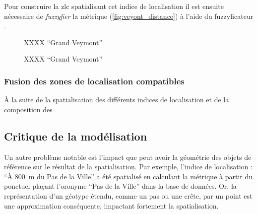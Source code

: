 Pour construire la \ac{zlc} spatialisant cet indice de localisation il
est ensuite nécessaire de \emph{fuzzyfier} la métrique
(\autoref{fig:veyont_distance}) à l'aide du fuzzyficateur
.

\begin{figure}
  \centering
  
  \caption{XXXX \enquote{Grand Veymont}}
  \label{fig:fuzzy_veyont_distance}
\end{figure}



\begin{figure}
  \centering
  
  \caption{XXXX \enquote{Grand Veymont}}
  \label{fig:Distance_GrandVeymont}
\end{figure}




\subsubsection{Fusion des zones de localisation compatibles}

À la suite de la spatialisation des différents indices de localisation
et de la composition des 

\subsection{Critique de la modélisation}
\label{subsec:9-2-3}


Un autre problème notable est l'impact que peut avoir la géométrie des
objets de référence sur le résultat de la spatialisation. Par exemple,
l'indice de localisation : \enquote{À \SI{800}{\meter} du Pas de la
  Ville} a été spatialisé en calculant la métrique
 à partir du ponctuel plaçant l'oronyme
\enquote{Pas de la Ville} dans la base de données. Or, la
représentation d'un géotype étendu, comme un pas ou une crête, par un
point est une approximation conséquente, impactant fortement la
spatialisation.


